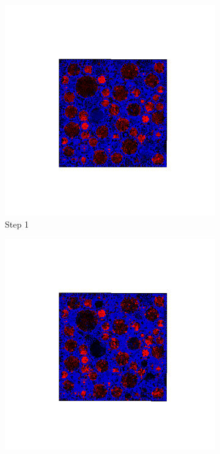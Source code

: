 
  \begin{figure}[ht!]
  \centering
      \begin{subfigure}{.25\textwidth}
        \centering
        \includegraphics[width=1.0\linewidth]{Files//A30P75_3_IS/DEP50-STEP(001).png}
      \caption{Step 1}
      \end{subfigure}%
      \begin{subfigure}{.25\textwidth}
        \centering
        \includegraphics[width=1.0\linewidth]{Files/A30P75_3_IS/DEP50-STEP(002).png}

\end{subfigure}
\end{figure}
